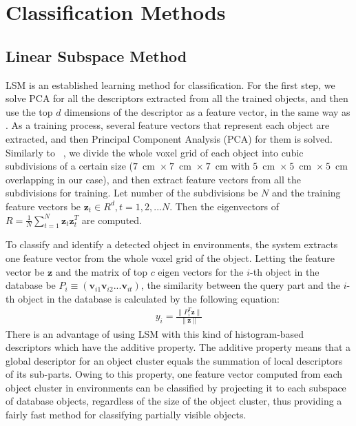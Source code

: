\documentclass[letterpaper, 10 pt, conference]{sty/ieeeconf}
\begin{document}
\section{Classification Methods}
\label{sec:classification}

\subsection{Linear Subspace Method}
\label{sec:subspace}
LSM is an established learning method for classification. 
For the first step, we solve PCA for all the descriptors extracted from all the trained objects, 
and then use the top $d$ dimensions of the descriptor as a feature vector, in the same way as \cite{kanezaki2011icra}.
As a training process, several feature vectors that represent each object are extracted, 
and then Principal Component Analysis (PCA) for them is solved. 
Similarly to ~\cite{kanezaki2011icra}, we divide the whole voxel grid of each object into 
cubic subdivisions of a certain size ($7$~cm~$\times~7$~cm~$\times~7$~cm with $5$~cm~$\times~5$~cm~$\times~5$~cm overlapping in our case), and then extract feature vectors from all the subdivisions for training. 
Let number of the subdivisions be $N$ 
and the training feature vectors be $\bm{z}_t \in R^d, t=1,2,...N$. 
Then the eigenvectors of $R=\frac{1}{N} \sum^{N}_{t=1} \bm{z}_t \bm{z}_t^T$ are computed. 

To classify and identify a detected object in environments, the system extracts one feature vector from the whole voxel grid of the object. 
Letting the feature vector be $\bm{z}$ and the matrix of top $c$ eigen vectors for the $i$-th object in the database be $P_i \equiv (\bm{v}_{i1} \bm{v}_{i2} ... \bm{v}_{it})$,
the similarity between the query part and the $i$-th object in the database is calculated by the following equation:
\begin{eqnarray}\label{eq:y_calc}
  y_i = \frac{\| P_i^T \bm{z} \|}{\| \bm{z} \|}
\end{eqnarray}
There is an advantage of using LSM with this kind of histogram-based descriptors which have the additive property. 
The additive property means that a global descriptor for an object cluster equals the summation of local descriptors of its sub-parts. 
Owing to this property, one feature vector computed from each object cluster in environments can be classified by projecting it to 
each subspace of database objects, regardless of the size of the object cluster, thus providing a fairly fast method for classifying partially visible objects.
\end{document}
